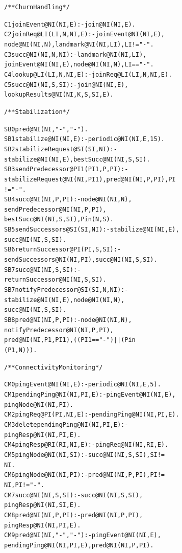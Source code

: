\documentclass{sig-alt-full}
\newenvironment{overlog}{\begin{alltt}\small}{\end{alltt}}
\begin{document}
\begin{overlog}
/** Churn Handling */

C1 joinEvent@NI(NI,E) :- join@NI(NI,E).
C2 joinReq@LI(LI,N,NI,E) :- joinEvent@NI(NI,E),
  node@NI(NI,N), landmark@NI(NI,LI), LI != "-".
C3 succ@NI(NI,N,NI) :- landmark@NI(NI,LI),
  joinEvent@NI(NI,E), node@NI(NI,N), LI == "-".
C4 lookup@LI(LI,N,NI,E) :- joinReq@LI(LI,N,NI,E).
C5 succ@NI(NI,S,SI) :- join@NI(NI,E),
  lookupResults@NI(NI,K,S,SI,E).


/** Stabilization */

SB0 pred@NI(NI,"-","-").
SB1 stabilize@NI(NI,E) :- periodic@NI(NI,E,15).
SB2 stabilizeRequest@SI(SI,NI) :-
  stabilize@NI(NI,E), bestSucc@NI(NI,S,SI).
SB3 sendPredecessor@PI1(PI1,P,PI) :-
  stabilizeRequest@NI(NI,PI1), pred@NI(NI,P,PI), PI
  != "-".
SB4 succ@NI(NI,P,PI) :- node@NI(NI,N),
  sendPredecessor@NI(NI,P,PI),
  bestSucc@NI(NI,S,SI), P in (N,S).
SB5 sendSuccessors@SI(SI,NI) :- stabilize@NI(NI,E),
  succ@NI(NI,S,SI).
SB6 returnSuccessor@PI(PI,S,SI) :-
  sendSuccessors@NI(NI,PI), succ@NI(NI,S,SI).
SB7 succ@NI(NI,S,SI) :-
  returnSuccessor@NI(NI,S,SI).
SB7 notifyPredecessor@SI(SI,N,NI) :-
  stabilize@NI(NI,E), node@NI(NI,N),
  succ@NI(NI,S,SI).
SB8 pred@NI(NI,P,PI) :- node@NI(NI,N),
  notifyPredecessor@NI(NI,P,PI),
  pred@NI(NI,P1,PI1), ((PI1 == "-") || (P in
  (P1,N))).


/** Connectivity Monitoring */

CM0 pingEvent@NI(NI,E) :- periodic@NI(NI,E,5).
CM1 pendingPing@NI(NI,PI,E) :- pingEvent@NI(NI,E),
  pingNode@NI(NI,PI).
CM2 pingReq@PI(PI,NI,E) :- pendingPing@NI(NI,PI,E).
CM3 delete pendingPing@NI(NI,PI,E) :-
  pingResp@NI(NI,PI,E).
CM4 pingResp@RI(RI,NI,E) :- pingReq@NI(NI,RI,E).
CM5 pingNode@NI(NI,SI) :- succ@NI(NI,S,SI), SI !=
  NI.
CM6 pingNode@NI(NI,PI) :- pred@NI(NI,P,PI), PI !=
  NI, PI != "-".
CM7 succ@NI(NI,S,SI) :- succ@NI(NI,S,SI),
  pingResp@NI(NI,SI,E).
CM8 pred@NI(NI,P,PI) :- pred@NI(NI,P,PI),
  pingResp@NI(NI,PI,E).
CM9 pred@NI(NI,"-","-") :- pingEvent@NI(NI,E),
  pendingPing@NI(NI,PI,E), pred@NI(NI,P,PI).

\end{overlog}
\end{document}

